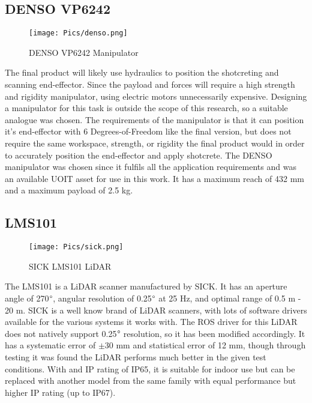 \subsection{DENSO VP6242}
\begin{figure}[H]
    \centering
    \texttt{[image: Pics/denso.png]}
    \caption{DENSO VP6242 Manipulator \cite{densopage}}
    \label{fig:sick}
\end{figure}
The final product will likely use hydraulics to position the shotcreting and scanning end-effector. Since the payload and forces will require a high strength and rigidity manipulator, using electric motors unnecessarily expensive. Designing a manipulator for this task is outside the scope of this research, so a suitable analogue was chosen. The requirements of the manipulator is that it can position it's end-effector with 6 Degrees-of-Freedom like the final version, but does not require the same workspace, strength, or rigidity the final product would in order to accurately position the end-effector and apply shotcrete. The DENSO manipulator was chosen since it fulfils all the application requirements and was an available UOIT asset for use in this work. It has a maximum reach of 432 mm and a maximum payload of 2.5 kg.\\ 
\subsection{LMS101}

\begin{figure}[H]
    \centering
    \texttt{[image: Pics/sick.png]}
    \caption{SICK LMS101 LiDAR \cite{sickpage}}
    \label{fig:sick}
\end{figure}
The LMS101 is a LiDAR scanner manufactured by SICK. It has an aperture angle of 270$\degree$, angular resolution of 0.25$\degree$ at 25 Hz, and optimal range of 0.5 m - 20 m. SICK is a well know brand of LiDAR scanners, with lots of software drivers available for the various systems it works with. The ROS driver for this LiDAR does not natively support 0.25$\degree$ resolution, so it has been modified accordingly. It has a systematic error of $\pm$30 mm and statistical error	of 12 mm, though through testing it was found the LiDAR performs much better in the given test conditions. With and IP rating of IP65, it is suitable for indoor use but can be replaced with another model from the same family with equal performance but higher IP rating (up to IP67).\\
